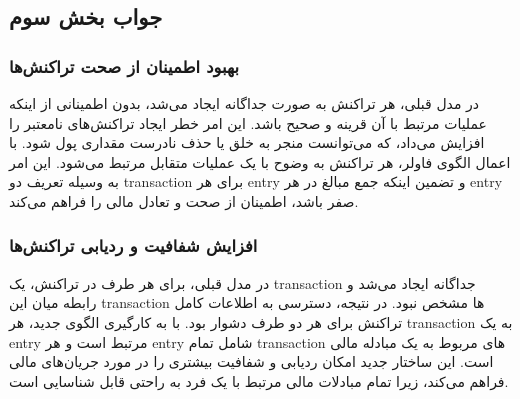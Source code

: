 \subsection*{جواب بخش سوم}

\subsubsection*{بهبود اطمینان از صحت تراکنش‌ها}
در مدل قبلی، هر تراکنش به صورت جداگانه ایجاد می‌شد، بدون اطمینانی از اینکه عملیات مرتبط با آن قرینه و صحیح باشد. این امر خطر ایجاد تراکنش‌های نامعتبر را افزایش می‌داد، که می‌توانست منجر به خلق یا حذف نادرست مقداری پول شود. با اعمال الگوی فاولر، هر تراکنش به وضوح با یک عملیات متقابل مرتبط می‌شود. این امر به وسیله تعریف دو transaction برای هر entry و تضمین اینکه جمع مبالغ در هر entry صفر باشد، اطمینان از صحت و تعادل مالی را فراهم می‌کند.


\subsubsection*{افزایش شفافیت و ردیابی تراکنش‌ها}

در مدل قبلی، برای هر طرف در تراکنش، یک transaction جداگانه ایجاد می‌شد و رابطه میان این transaction‌ ها مشخص نبود. در نتیجه، دسترسی به اطلاعات کامل تراکنش برای هر دو طرف دشوار بود. با به کارگیری الگوی جدید، هر transaction به یک entry مرتبط است و هر entry شامل تمام transaction‌ های مربوط به یک مبادله مالی است. این ساختار جدید امکان ردیابی و شفافیت بیشتری را در مورد جریان‌های مالی فراهم می‌کند، زیرا تمام مبادلات مالی مرتبط با یک فرد به راحتی قابل شناسایی است.
